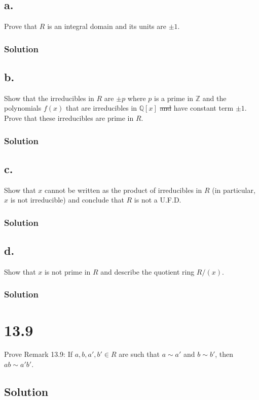 \documentclass[fleqn]{article}
\begin{document}
        \subsection{a.}
        Prove that $R$ is an integral domain and its units are $\pm 1$.
            
            \subsubsection{Solution}
            
        
        \subsection{b.}
        Show that the irreducibles in $R$ are $\pm p$ where $p$ is a prime in $\mathbb{Z}$ and the polynomials $f(x)$ that are irreducibles in $\mathbb{Q}[x]$ \sout{and} have constant term $\pm 1$.  Prove that these irreducibles are prime in $R$.
            
            \subsubsection{Solution}
            
        
        \subsection{c.}
        Show that $x$ cannot be written as the product of irreducibles in $R$ (in particular, $x$ is not irreducible) and conclude that $R$ is not a U.F.D.
            
            \subsubsection{Solution}
            
        
        \subsection{d.}
        Show that $x$ is not prime in $R$ and describe the quotient ring $R/(x)$.
            
            \subsubsection{Solution}
            
    
    \section{13.9}
    Prove Remark 13.9: If $a, b, a', b' \in R$ are such that $a \sim a'$ and $b \sim b'$, then $ab \sim a'b'$.
        
        \subsection{Solution}
        
    
\end{document}
